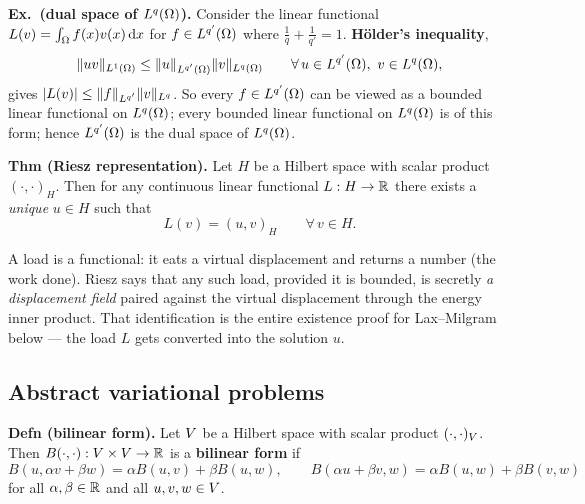 \medskip\noindent
\textbf{Ex.\ (dual space of $L^{q}(\Omega)$).} Consider the linear functional
$L(v)=\int_{\Omega}f(x)v(x)\,\mathrm{d} x$ for $f\in L^{q'}(\Omega)$ where
$\tfrac1q+\tfrac1{q'}=1$. \textbf{H\"older's inequality},
\begin{equation}\label{eq:l13holder}
  \lVert uv\rVert_{L^{1}(\Omega)}\le\lVert u\rVert_{L^{q'}(\Omega)}\lVert v\rVert_{L^{q}(\Omega)}
  \qquad\forall\,u\in L^{q'}(\Omega),\ v\in L^{q}(\Omega),
\end{equation}
gives $|L(v)|\le\lVert f\rVert_{L^{q'}}\lVert v\rVert_{L^{q}}$. So every
$f\in L^{q'}(\Omega)$ can be viewed as a bounded linear functional on $L^{q}(\Omega)$;
every bounded linear functional on $L^{q}(\Omega)$ is of this form; hence
$L^{q'}(\Omega)$ is the dual space of $L^{q}(\Omega)$.

\medskip\noindent
\textbf{Thm (Riesz representation).} Let $H$ be a Hilbert space with scalar
product $(\cdot,\cdot)_{H}$. Then for any continuous linear functional
$L:H\to\mathbb{R}$ there exists a \emph{unique} $u\in H$ such that
\begin{equation}\label{eq:l13riesz}
  L(v)=(u,v)_{H}\qquad\forall\,v\in H .
\end{equation}

\begin{mechanics}
A load is a functional: it eats a virtual displacement and returns a number
(the work done). Riesz says that any such load, provided it is bounded, is
secretly \emph{a displacement field} paired against the virtual displacement
through the energy inner product. That identification is the entire existence
proof for Lax--Milgram below --- the load $L$ gets converted into the solution
$u$.
\end{mechanics}

\subsection*{Abstract variational problems}

\textbf{Defn (bilinear form).} Let $V$ be a Hilbert space with scalar
product $(\cdot,\cdot)_{V}$. Then $B(\cdot,\cdot):V\times V\to\mathbb{R}$ is a
\textbf{bilinear form} if
\begin{equation}\label{eq:l13bilin}
  B(u,\alpha v+\beta w)=\alpha B(u,v)+\beta B(u,w),\qquad
  B(\alpha u+\beta v,w)=\alpha B(u,w)+\beta B(v,w)
\end{equation}
for all $\alpha,\beta\in\mathbb{R}$ and all $u,v,w\in V$.

